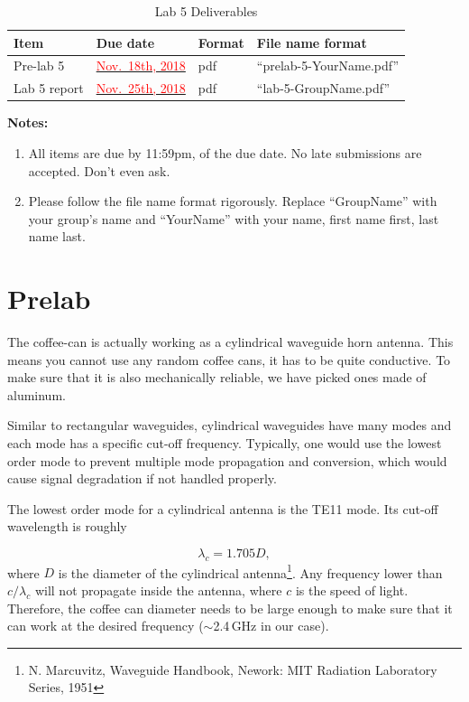 \documentclass[letterpaper, 11pt]{article}
\newcommand{\due}[1]{\href{https://github.com/ucdart/UCD-EEC134/blob/master/support/schedule/eec134-schedule.pdf}{\textcolor{red}{#1}}}
\begin{document}

\begin{table}[h]
	\footnotesize
	\caption{Lab 5 Deliverables}
	\renewcommand{\arraystretch}{1.2}
	\begin{tabular}{|m{1in}|l|m{0.45in}|m{2in}|}
		\hline
		\textbf{Item} & \textbf{Due date} & \textbf{Format} & \textbf{File name format} \\
		\hline
		\hline
		Pre-lab 5 & \due{Nov.~18th, 2018} & pdf & ``prelab-5-YourName.pdf''\\
				
		\hline
		Lab 5 report & \due{Nov.~25th, 2018} & pdf & ``lab-5-GroupName.pdf''\\
		\hline
	\end{tabular}
	\label{tab:deliverables}
\end{table}

\textbf{Notes:}
\begin{enumerate}
	\item All items are due by 11:59pm, of the due date. No late submissions are accepted. Don't even ask. 
	
	\item Please follow the file name format rigorously. Replace ``GroupName'' with your group's name and ``YourName'' with your name, first name first, last name last. 
\end{enumerate}


\section{Prelab}

The coffee-can is actually working as a cylindrical waveguide horn antenna. This means you cannot use any random coffee cans, it has to be quite conductive. To make sure that it is also mechanically reliable, we have picked ones made of aluminum. 

Similar to rectangular waveguides, cylindrical waveguides have many modes and each mode has a specific cut-off frequency. Typically, one would use the lowest order mode to prevent multiple mode propagation and conversion, which would cause signal degradation if not handled properly. 

The lowest order mode for a cylindrical antenna is the TE11 mode. Its cut-off wavelength is roughly 

\[
\lambda_c = 1.705 D,
\]
where $D$ is the diameter of the cylindrical antenna\footnote{N. Marcuvitz, Waveguide Handbook, Nework: MIT Radiation Laboratory Series, 1951}. Any frequency lower than $c/\lambda_c$ will not propagate inside the antenna, where $c$ is the speed of light. Therefore, the coffee can diameter needs to be large enough to make sure that it can work at the desired frequency ($\sim$2.4\,GHz in our case). 
\end{document}
